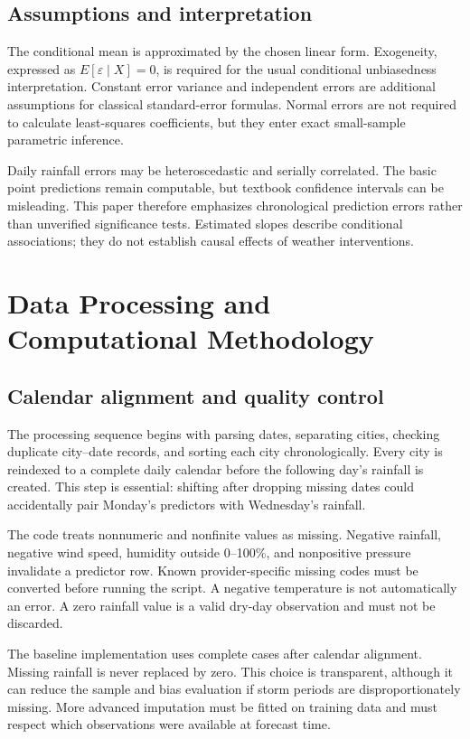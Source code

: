 \documentclass[11pt,a4paper]{article}
\newcommand{\sectionpage}[1]{\clearpage\section{#1}}
\begin{document}
\subsection{Assumptions and interpretation}
The conditional mean is approximated by the chosen linear form. Exogeneity, expressed as $E[\varepsilon\mid X]=0$, is required for the usual conditional unbiasedness interpretation. Constant error variance and independent errors are additional assumptions for classical standard-error formulas. Normal errors are not required to calculate least-squares coefficients, but they enter exact small-sample parametric inference.

Daily rainfall errors may be heteroscedastic and serially correlated. The basic point predictions remain computable, but textbook confidence intervals can be misleading. This paper therefore emphasizes chronological prediction errors rather than unverified significance tests. Estimated slopes describe conditional associations; they do not establish causal effects of weather interventions.

\sectionpage{Data Processing and Computational Methodology}
\subsection{Calendar alignment and quality control}
The processing sequence begins with parsing dates, separating cities, checking duplicate city--date records, and sorting each city chronologically. Every city is reindexed to a complete daily calendar before the following day's rainfall is created. This step is essential: shifting after dropping missing dates could accidentally pair Monday's predictors with Wednesday's rainfall.

The code treats nonnumeric and nonfinite values as missing. Negative rainfall, negative wind speed, humidity outside 0--100\%, and nonpositive pressure invalidate a predictor row. Known provider-specific missing codes must be converted before running the script. A negative temperature is not automatically an error. A zero rainfall value is a valid dry-day observation and must not be discarded.

The baseline implementation uses complete cases after calendar alignment. Missing rainfall is never replaced by zero. This choice is transparent, although it can reduce the sample and bias evaluation if storm periods are disproportionately missing. More advanced imputation must be fitted on training data and must respect which observations were available at forecast time.
\end{document}
